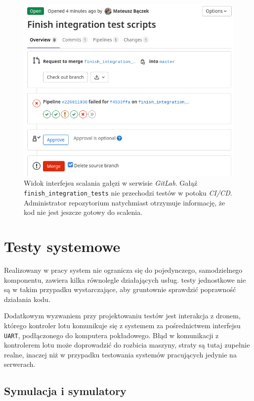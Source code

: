 \begin{figure}[H]
	\centering
	\includegraphics[width=0.8\linewidth]{rys05/failed_pipeline.png}
    \caption{
        Widok interfejsu scalania gałęzi w serwisie \textit{GitLab}.
        Gałąź \texttt{finish\_integration\_tests} nie przechodzi testów
        w potoku \textit{CI/CD}. Administrator repozytorium natychmiast
        otrzymuje informację, że kod nie jest jeszcze gotowy do scalenia.
    }
	\label{failed_pipeline}
\end{figure}

\section{Testy systemowe}

Realizowany w pracy system nie ogranicza się do pojedynczego,
samodzielnego komponentu, zawiera kilka równolegle działających
usług. testy jednostkowe nie są w takim przypadku wystarczające,
aby gruntownie sprawdzić poprawność działania kodu. 

Dodatkowym wyzwaniem przy projektowaniu testów jest interakcja z dronem,
którego kontroler lotu komunikuje się z systemem za pośrednictwem 
interfejsu \texttt{UART}, podłączonego do komputera pokładowego.
Błąd w komunikacji z kontrolerem lotu może doprowadzić do 
rozbicia maszyny, straty są tutaj zupełnie realne, inaczej
niż w przypadku testowania systemów pracujących jedynie na serwerach. 

\subsection{
    Symulacja i symulatory
    \color{white}\cite{simulation_and_simulacra}
}

